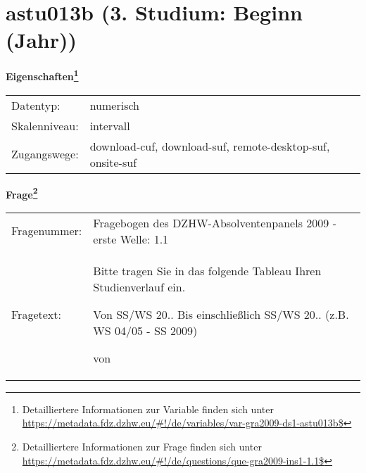 
    \setcounter{footnote}{0}

    \vspace*{-1.8cm}
	\section{astu013b (3. Studium: Beginn (Jahr))}
	\label{section:astu013b}



    \vspace*{0.5cm}
    \noindent\textbf{Eigenschaften\footnote{Detailliertere Informationen zur Variable finden sich unter
		\url{https://metadata.fdz.dzhw.eu/\#!/de/variables/var-gra2009-ds1-astu013b$}}}\\
	\begin{tabularx}{\hsize}{@{}lX}
	Datentyp: & numerisch \\
	Skalenniveau: & intervall \\
	Zugangswege: &
	  download-cuf, 
	  download-suf, 
	  remote-desktop-suf, 
	  onsite-suf
 \\
    \end{tabularx}



				\vspace*{0.5cm}
                \noindent\textbf{Frage\footnote{Detailliertere Informationen zur Frage finden sich unter
		              \url{https://metadata.fdz.dzhw.eu/\#!/de/questions/que-gra2009-ins1-1.1$}}}\\
				\begin{tabularx}{\hsize}{@{}lX}
					Fragenummer: &
					  Fragebogen des DZHW-Absolventenpanels 2009 - erste Welle:
					  1.1
 \\
					Fragetext: & Bitte tragen Sie in das folgende Tableau Ihren Studienverlauf ein.\par  Von SS/WS 20.. Bis einschließlich SS/WS 20.. (z.B. WS 04/05 - SS 2009)\par  von \\
				\end{tabularx}





